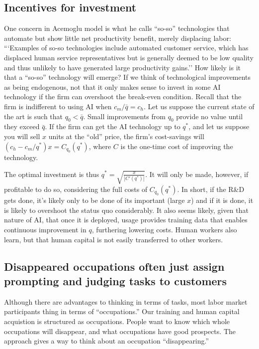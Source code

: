 \documentclass{article}
\begin{document}
\subsection{Incentives for investment}
One concern in Acemoglu model is what he calls ``so-so'' technologies that automate but show little net productivity benefit, merely displacing labor: ```Examples of so-so technologies include automated customer service, which has displaced human service representatives but is generally deemed to be low quality and thus unlikely to have generated large productivity gains.''
How likely is it that a ``so-so'' technology will emerge?
If we think of technological improvements as being endogenous, not that it only makes sense to invest in some AI technology if the firm can overshoot the break-even condition. 
Recall that the firm is indifferent to using AI when $c_m / \bar{q} = c_h$. 
Let us suppose the current state of the art is such that $q_0 < \bar{q}$.
Small improvements from $q_0$ provide no value until they exceed $\bar{q}$. 
If the firm can get the AI technology up to $q^*$, and let us suppose you will sell $x$ units at the ``old'' price, 
the firm's cost-savings will $(c_h - c_m / q^*) x = C_{q_0}(q^*)$, where $C$ is the one-time cost of improving the technology.

The optimal investment is thus $q^* = \sqrt{\frac{x}{|C'(q^*)|}}$.
It will only be made, however, if profitable to do so, considering the full costs of $C_{q_0}(q^*)$.
In short, if the R\&D gets done, it's likely only to be done of its important (large $x$) and if it is done, it is likely to overshoot the status quo considerably.  
It also seems likely, given that nature of AI, that once it is deployed, usage provides training data that enables continuous improvement in $q$, furthering lowering costs. 
Human workers also learn, but that human capital is not easily transferred to other workers. 


\subsection{Disappeared occupations often just assign prompting and judging tasks to customers}
Although there are advantages to thinking in terms of tasks, most labor market participants thing in terms of ``occupations.'' 
Our training and human capital acquistion is structured as occupations.
People want to know which whole occupations will disappear, and what occupations have good prospects. 
The approach gives a way to think about an occupation ``disappearing.''
\end{document}
